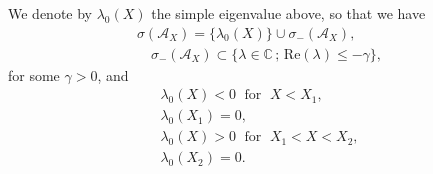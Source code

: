 We denote by $\lambda_0(X)$ the simple eigenvalue above, so that we have
\begin{align*}
\sigma(\mathcal{A}_X) = \{ \lambda_0(X)\} \cup \sigma_- (\mathcal{A}_X), \\
\quad \sigma_-(\mathcal{A}_X) \subset \{\lambda \in \mathbb{C}\, ; \, 
\mathrm{Re} (\lambda) \leqslant -\gamma \},
\end{align*}
for some $\gamma > 0$, and
\begin{align}
\lambda_0(X) < 0 \; \mbox{ for } \; X < X_1, \label{lambda0} \\
\lambda_0 (X_1) = 0, \nonumber \\
\lambda_0 (X) > 0 \; \mbox{ for } \; X_1 < X< X_2, \nonumber\\
\lambda_0(X_2) = 0. \nonumber
\end{align}

